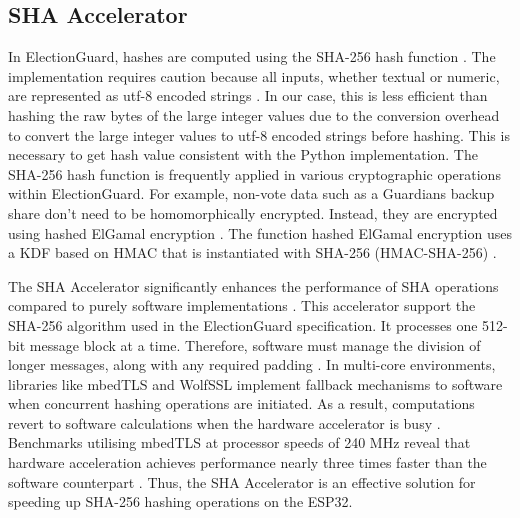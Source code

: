 \subsection{\ac{SHA} Accelerator}
In ElectionGuard, hashes are computed using the \ac{SHA}-256 hash function \cite[26]{eg-spec}. The implementation requires caution because all inputs, whether textual or numeric, are represented as utf-8 encoded strings \cite[26]{eg-spec}. In our case, this is less efficient than hashing the raw bytes of the large integer values due to the conversion overhead to convert the large integer values to utf-8 encoded strings before hashing. This is necessary to get hash value consistent with the Python implementation. The \ac{SHA}-256 hash function is frequently applied in various cryptographic operations within ElectionGuard. For example, non-vote data such as a Guardians backup share don't need to be homomorphically encrypted. Instead, they are encrypted using hashed ElGamal encryption \cite[7]{eg-spec}. The function hashed ElGamal encryption uses a \ac{KDF} based on \ac{HMAC} that is instantiated with SHA-256 (HMAC-SHA-256) \cite[7]{eg-spec}. 

The \ac{SHA} Accelerator significantly enhances the performance of \ac{SHA} operations compared to purely software implementations \cite[589]{esp32-ref}. This accelerator support the \ac{SHA}-256 algorithm used in the ElectionGuard specification. It processes one 512-bit message block at a time. Therefore, software must manage the division of longer messages, along with any required padding \cite[2]{esp32-series}. In multi-core environments, libraries like mbedTLS and WolfSSL implement fallback mechanisms to software when concurrent hashing operations are initiated. As a result, computations revert to software calculations when the hardware accelerator is busy \cite{mbedTLS-fork} \cite{wolfSSL-port}. Benchmarks utilising mbedTLS at processor speeds of 240 MHz reveal that hardware acceleration achieves performance nearly three times faster than the software counterpart \cite[41-42]{eval-crypto}. Thus, the \ac{SHA} Accelerator is an effective solution for speeding up \ac{SHA}-256 hashing operations on the ESP32.


